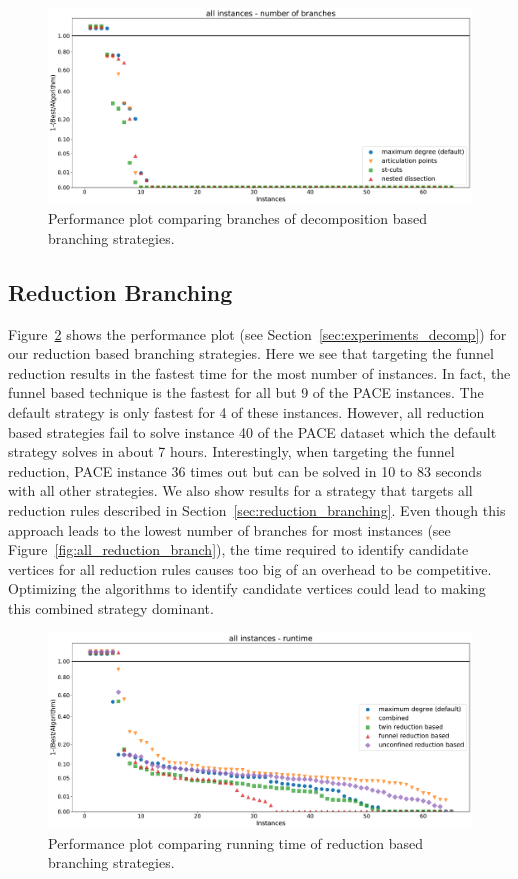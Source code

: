 \documentclass[a4paper,UKenglish,cleveref, autoref, thm-restate]{lipics-v2021}
\begin{document}
\begin{figure}[ht]
  \includegraphics[width=\textwidth]{plots/all_decomposition_based_branch}
  \caption{Performance plot comparing branches of decomposition based branching strategies.}
  \label{fig:all_decomp_branch}
\end{figure}

\subsection{Reduction Branching}
Figure~\ref{fig:all_reduction_time} shows the performance plot (see
Section~\ref{sec:experiments_decomp}) for our reduction
based branching strategies. Here we see that targeting the funnel reduction
results in the fastest time for the most number of instances. In fact, the
funnel based technique is the fastest for all but 9 of the PACE instances. The
default strategy is only fastest for 4 of these instances. However, all
reduction based strategies fail to solve instance 40 of the PACE dataset which
the default strategy solves in about 7 hours.
Interestingly, when targeting the funnel reduction, PACE instance 36 times out
but can be solved in 10 to 83 seconds with all other
strategies. We also show results for a strategy that targets all reduction rules
described in Section~\ref{sec:reduction_branching}. Even though this approach
leads to the lowest number of branches for most instances (see Figure~\ref{fig:all_reduction_branch}), the time required to
identify candidate vertices for all reduction rules causes too big of an
overhead to be competitive. Optimizing the algorithms to identify candidate
vertices could lead to making this combined strategy dominant.

\begin{figure}[ht]
  \includegraphics[width=\textwidth]{plots/all_reduction_based_time}
  \caption{Performance plot comparing running time of reduction based branching strategies.}
  \label{fig:all_reduction_time}
\end{figure}
\end{document}
